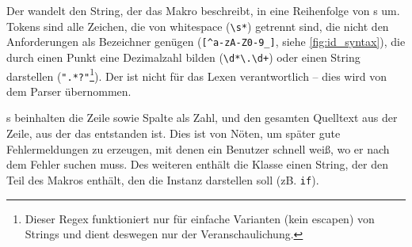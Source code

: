       Der  wandelt den String, der das Makro beschreibt, in eine Reihenfolge von s um. Tokens sind alle Zeichen, die von whitespace (\lstinline[language=MyRegex]$\s*$) getrennt sind, die nicht den Anforderungen als Bezeichner genügen (\lstinline[language=MyRegex]$[^a-zA-Z0-9_]$, siehe \autoref{fig:id_syntax}), die durch einen Punkt eine Dezimalzahl bilden (\lstinline[language=MyRegex]$\d*\.\d+$) oder einen String darstellen (\lstinline[language=MyRegex]$".*?"$\footnote{
        Dieser Regex funktioniert nur für einfache Varianten (kein escapen) von Strings und dient deswegen nur der Veranschaulichung.
      }). Der  ist nicht für das
      Lexen %
      verantwortlich -- dies wird von dem Parser übernommen.

      s beinhalten die Zeile sowie Spalte als Zahl, und den gesamten Quelltext aus der Zeile, aus der das  entstanden ist. Dies ist von Nöten, um später gute Fehlermeldungen zu erzeugen, mit denen ein Benutzer schnell weiß, wo er nach dem Fehler suchen muss. Des weiteren enthält die Klasse einen String, der den Teil des Makros enthält, den die Instanz darstellen soll (zB. \lstinline[style=MyMacroStyleIn]$if$).

